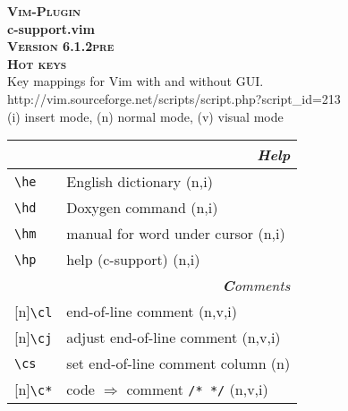 \documentclass[oneside,11pt,landscape,DIV16]{scrartcl}
\newcommand{\Pluginversion}{6.1.2pre}
\newcommand{\Rep}{{\tiny{[n]}}}
\begin{document}
%
%
\begin{multicols}{3}
%
\begin{center}
\textbf{\textsc{\small{Vim-Plugin}}}\\
\textbf{\LARGE{c-support.vim}}\\
\textbf{\textsc{\small{Version \Pluginversion}}}\\
\textbf{\textsc{\Huge{Hot keys}}}\\ 
Key mappings for Vim with and without GUI.\\
{\tiny{http://vim.sourceforge.net/scripts/script.php?script\_id=213}}\\
\vspace{1.0mm}
{\normalsize (i)} insert mode, {\normalsize (n)} normal mode, {\normalsize (v)} visual mode\\
\vspace{3.0mm}
%
\begin{tabular}[]{|p{10mm}|p{60mm}|}
\hline 
\multicolumn{2}{|r|}{\textsl{\textbf{H}elp}}\\
\hline \verb'\he'   & English dictionary \hfill (n,i)\\
\hline \verb'\hd'   & Doxygen command \hfill (n,i)\\
\hline \verb'\hm'   & manual for word under cursor  \hfill (n,i)\\
\hline \verb'\hp'   & help (c-support) \hfill (n,i)\\
\hline 
%
\hline
\multicolumn{2}{|r|}{\textsl{\textbf{C}omments}} \\
\hline \Rep\verb'\cl'  & end-of-line comment                     \hfill (n,v,i)\\
\hline \Rep\verb'\cj'  & adjust end-of-line comment              \hfill (n,v,i)\\
\hline     \verb'\cs'  & set end-of-line comment column          \hfill (n)    \\
\hline \Rep\verb'\c*'  & code $\Rightarrow$ comment \verb'/* */' \hfill (n,v,i)  \\

\end{tabular}
\end{center}
\end{multicols}
\end{document}
